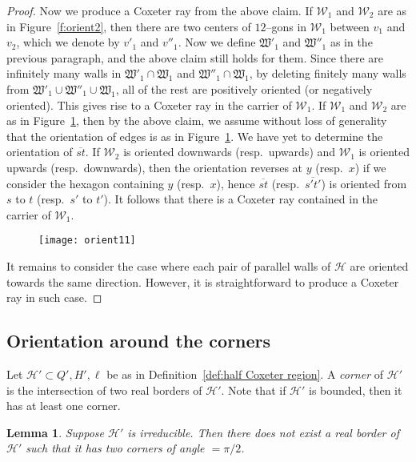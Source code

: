 \documentclass[11pt]{amsart}
\newcommand {\h}{\mathcal H}
\newcommand {\W}{\mathcal W}
\newtheorem{lemma}[theorem]{Lemma}
\theoremstyle{definition}
\begin{document}
\begin{proof}
Now we produce a Coxeter ray from the above claim. If $\W_1$ and $\W_2$ are as in Figure~\ref{f:orient2}, then there are two centers of $12$--gons in $\W_1$ between $v_1$ and $v_2$, which we denote by $v'_1$ and $v''_1$. Now we define $\mathfrak{W}'_1$ and $\mathfrak{W}''_1$ as in the previous paragraph, and the above claim still holds for them. Since there are infinitely many walls in $\mathfrak{W}'_1\cap \mathfrak{W}_1$ and $\mathfrak{W}''_1\cap \mathfrak{W}_1$, by deleting finitely many walls from $\mathfrak{W}'_1\cup \mathfrak{W}''_1\cup \mathfrak{W}_1$, all of the rest are positively oriented (or negatively oriented). This gives rise to a Coxeter ray in the carrier of $\W_1$. If $\W_1$ and $\W_2$ are as in Figure~\ref{f:orient11}, then by the above claim, we assume without loss of generality that the orientation of edges is as in Figure~\ref{f:orient11}. We have yet to determine the orientation of $\overline{st}$. If $\W_2$ is oriented downwards (resp.\ upwards) and $\W_1$ is oriented upwards (resp.\ downwards), then the orientation reverses at $y$ (resp.\ $x$) if we consider the hexagon containing $y$ (resp.\ $x$), hence $\overline{st}$ (resp.\ $\overline{s't'}$) is oriented from $s$ to $t$ (resp.\ $s'$ to $t'$). It follows that there is a Coxeter ray contained in the carrier of $\W_1$.
\begin{figure}[h!]
	\centering
	\texttt{[image: orient11]}
	\caption{}
	\label{f:orient11}
\end{figure}

It remains to consider the case where each pair of parallel walls of $\h$ are oriented towards the same direction. However, it is straightforward to produce a Coxeter ray in such case.
\end{proof}



\subsection{Orientation around the corners}
Let $\h'\subset Q', H', \ell$ be as in Definition~\ref{def:half Coxeter region}. A \emph{corner} of $\h'$ is the intersection of two real borders of $\h'$. Note that if $\h'$ is bounded, then it has at least one corner. 

\begin{lemma}
	\label{lem:two right angle}
Suppose $\h'$ is irreducible. Then there does not exist a real border of $\h'$ such that it has two corners of angle $=\pi/2$. 
\end{lemma}
\end{document}
